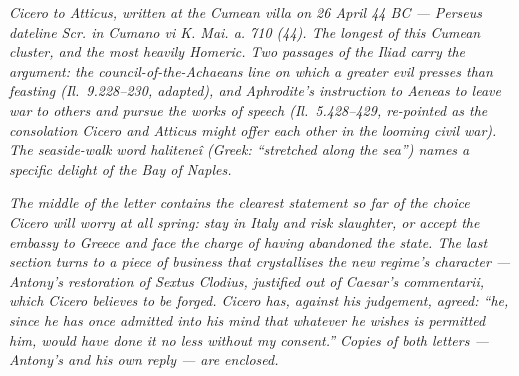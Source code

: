 
\textit{Cicero to Atticus, written at the Cumean villa on 26
April 44 BC --- Perseus dateline \textit{Scr. in Cumano vi K.
Mai. a. 710 (44)}. The longest of this Cumean cluster, and the
most heavily Homeric. Two passages of the \textit{Iliad} carry
the argument: the council-of-the-Achaeans line on which a
greater evil presses than feasting (\textit{Il.}~9.228--230,
adapted), and Aphrodite's instruction to Aeneas to leave war
to others and pursue the works of speech (\textit{Il.}~5.428--429,
re-pointed as the consolation Cicero and Atticus might offer
each other in the looming civil war). The seaside-walk word
\textit{halitene\^i} (\textit{Greek: ``stretched along the
sea''}) names a specific delight of the Bay of Naples.}

\textit{The middle of the letter contains the clearest
statement so far of the choice Cicero will worry at all
spring: stay in Italy and risk slaughter, or accept the
embassy to Greece and face the charge of having abandoned the
state. The last section turns to a piece of business that
crystallises the new regime's character --- Antony's
restoration of Sextus Clodius, justified out of Caesar's
\textit{commentarii}, which Cicero believes to be forged.
Cicero has, against his judgement, agreed: ``\textit{he, since
he has once admitted into his mind that whatever he wishes is
permitted him, would have done it no less without my
consent.}'' Copies of both letters --- Antony's and his own
reply --- are enclosed.}
